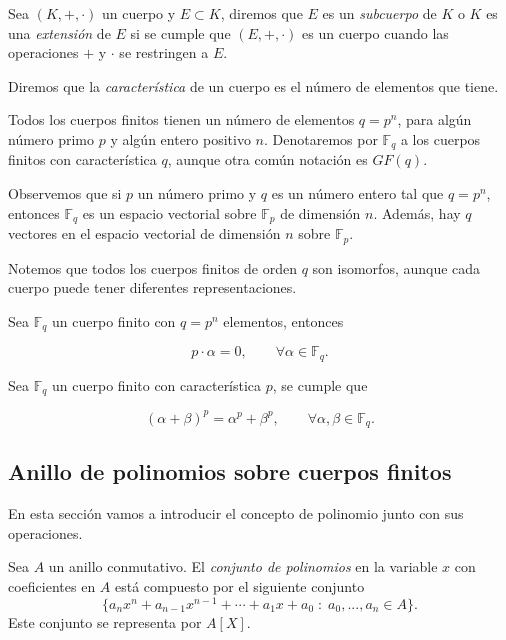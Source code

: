 Sea $(K, +, \cdot)$ un cuerpo y $E \subset K$, diremos que $E$ es un \emph{subcuerpo} de $K$ o $K$ es una \emph{extensión} de $E$ si se cumple que $(E, +, \cdot)$ es un cuerpo cuando las operaciones $+$ y $\cdot$ se restringen a $E$.

Diremos que la \emph{característica} de un cuerpo es el número de elementos que tiene.

Todos los cuerpos finitos tienen un número de elementos $q = p^n$, para algún número primo $p$ y algún entero positivo $n$. Denotaremos por $\mathbb{F}_q$ a los cuerpos finitos con característica $q$, aunque otra común notación es $GF(q)$.

Observemos que si $p$ un número primo y $q$ es un número entero tal que $q = p^n$, entonces $\mathbb{F}_q$ es un espacio vectorial sobre $\mathbb{F}_p$ de dimensión $n$. Además, hay $q$ vectores en el espacio vectorial de dimensión $n$ sobre $\mathbb{F}_p$.

Notemos que todos los cuerpos finitos de orden $q$ son isomorfos, aunque cada cuerpo puede tener diferentes representaciones.

\begin{proposition}
    Sea $\mathbb{F}_q$ un cuerpo finito con $q = p^n$ elementos, entonces 

    $$p \cdot \alpha = 0, \qquad \forall \alpha \in \mathbb{F}_q.$$
\end{proposition}

\begin{proposition}
    Sea $\mathbb{F}_q$ un cuerpo finito con característica $p$, se cumple que

    $$( \alpha + \beta )^p = \alpha^p + \beta^p, \qquad \forall \alpha, \beta \in \mathbb{F}_q.$$
\end{proposition}



\subsection{Anillo de polinomios sobre cuerpos finitos}

En esta sección vamos a introducir el concepto de polinomio junto con sus operaciones.

\begin{definition}
    Sea $A$ un anillo conmutativo. El \emph{conjunto de polinomios} en la variable $x$ con coeficientes en $A$ está compuesto por el siguiente conjunto
    $$\{ a_n x^n  + a_{n-1} x^{n-1} + \cdots + a_1 x + a_0 \; : \; a_0, ..., a_n \in A \}.$$
    Este conjunto se representa por $A[X]$.
\end{definition}

